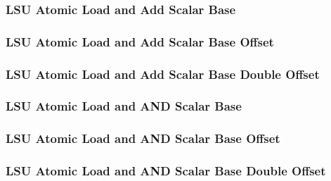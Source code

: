 \subsubsection[{\small LSU Atomic Load and Add Scalar Base}]{LSU Atomic Load and Add Scalar Base} \label{sec:format-LSU-ALADDSB}



\subsubsection[{\small LSU Atomic Load and Add Scalar Base Offset}]{LSU Atomic Load and Add Scalar Base Offset} \label{sec:format-LSU-ALADDSB.O}



\subsubsection[{\small LSU Atomic Load and Add Scalar Base Double Offset}]{LSU Atomic Load and Add Scalar Base Double Offset} \label{sec:format-LSU-ALADDSB.D}



\subsubsection[{\small LSU Atomic Load and AND Scalar Base}]{LSU Atomic Load and AND Scalar Base} \label{sec:format-LSU-ALANDSB}



\subsubsection[{\small LSU Atomic Load and AND Scalar Base Offset}]{LSU Atomic Load and AND Scalar Base Offset} \label{sec:format-LSU-ALANDSB.O}



\subsubsection[{\small LSU Atomic Load and AND Scalar Base Double Offset}]{LSU Atomic Load and AND Scalar Base Double Offset} \label{sec:format-LSU-ALANDSB.D}

